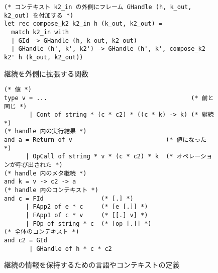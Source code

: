 \begin{figure}[t]
\begin{spacing}{0.9}
\begin{verbatim}
(* コンテキスト k2_in の外側にフレーム GHandle (h, k_out, k2_out) を付加する *)
let rec compose_k2 k2_in h (k_out, k2_out) =
  match k2_in with
  | GId -> GHandle (h, k_out, k2_out)
  | GHandle (h', k', k2') -> GHandle (h', k', compose_k2 k2' h (k_out, k2_out))
\end{verbatim}
\caption{継続を外側に拡張する関数}
\label{figure:compose}
\end{spacing}
\end{figure}

\begin{figure}[t]
\begin{spacing}{0.9}
\begin{verbatim}
(* 値 *)
type v = ...                                        (* 前と同じ *)
       | Cont of string * (c * c2) * ((c * k) -> k) (* 継続 *)
(* handle 内の実行結果 *)
and a = Return of v                          (* 値になった *)
      | OpCall of string * v * (c * c2) * k  (* オペレーションが呼び出された *)
(* handle 内のメタ継続 *)
and k = v -> c2 -> a
(* handle 内のコンテキスト *)
and c = FId                (* [.] *)
      | FApp2 of e * c     (* [e [.]] *)
      | FApp1 of c * v     (* [[.] v] *)
      | FOp of string * c  (* [op [.]] *)
(* 全体のコンテキスト *)
and c2 = GId
       | GHandle of h * c * c2
\end{verbatim}
\caption{継続の情報を保持するための言語やコンテキストの定義}
\label{figure:k_6cps}
\end{spacing}
\end{figure}

